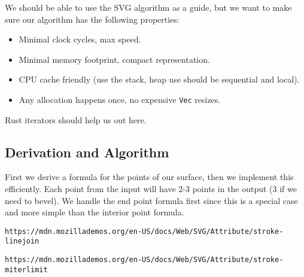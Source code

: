 \documentclass[]{article}
\begin{document}
We should be able to use the SVG algorithm as a guide, but we want to make sure our algorithm has the following properties:
\begin{itemize}
	\item Minimal clock cycles, max speed.
	\item Minimal memory footprint, compact representation.
	\item CPU cache friendly (use the stack, heap use should be sequential and local).
	\item Any allocation happens once, no expensive \texttt{Vec} resizes.
\end{itemize}
Rust iterators should help us out here.

\subsection{Derivation and Algorithm}
First we derive a formula for the points of our surface, then we implement this efficiently. Each point from the input will have 2-3 points in the output (3 if we need to bevel). We handle the end point formula first since this is a special case and more simple than the interior point formula.



\begin{thebibliography}{9}
	\texttt{https://mdn.mozillademos.org/en-US/docs/Web/SVG/Attribute/stroke-linejoin}
	
	\texttt{https://mdn.mozillademos.org/en-US/docs/Web/SVG/Attribute/stroke-miterlimit}
\end{thebibliography}
\end{document}
